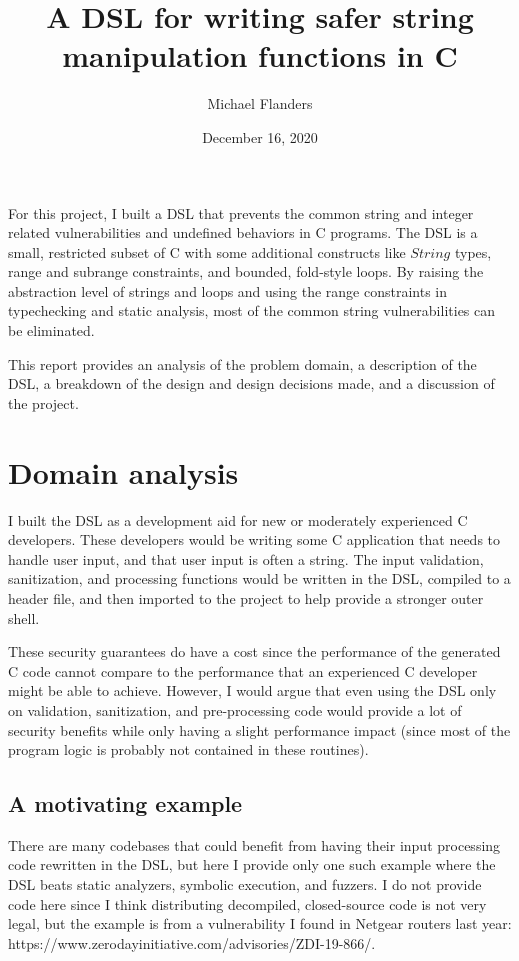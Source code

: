 \documentclass[letterpaper]{article}
\title{A DSL for writing safer string manipulation functions in C}
\author{Michael Flanders}
\date{December 16, 2020}
\begin{document}
\maketitle


For this project, I built a DSL that prevents the common string and
integer related vulnerabilities and undefined behaviors in C programs.
The DSL is a small, restricted subset of C with some additional constructs
like $String$ types, range and subrange constraints, and bounded,
fold-style loops. By raising the abstraction level of strings and loops
and using the range constraints in typechecking and static analysis,
most of the common string vulnerabilities can be eliminated.

This report provides an analysis of the problem domain, a description
of the DSL, a breakdown of the design and design decisions made, and
a discussion of the project.

\section{Domain analysis}

I built the DSL as a development aid for new or moderately experienced
C developers. These developers would be writing some C application
that needs to handle user input, and that user input is often a string.
The input validation, sanitization, and processing functions would be
written in the DSL, compiled to a header file, and then imported to
the project to help provide a stronger outer shell.

These security guarantees do have a cost since the performance of the
generated C code cannot compare to the performance that an experienced
C developer might be able to achieve. However, I would argue that even
using the DSL only on validation, sanitization, and pre-processing code would
provide a lot of security benefits while only having a slight performance
impact (since most of the program logic is probably not contained in these
routines).

\subsection{A motivating example}

There are many codebases that could benefit from having their input processing
code rewritten in the DSL, but here I provide only one such example where the
DSL beats static analyzers, symbolic execution, and fuzzers. I do not
provide code here since I think distributing decompiled, closed-source code
is not very legal, but the example is from a vulnerability I found in Netgear
routers last year: https://www.zerodayinitiative.com/advisories/ZDI-19-866/.
\end{document}
